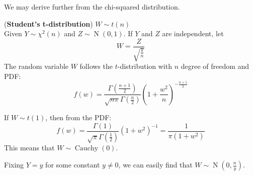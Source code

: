 \documentclass{huhtakm-template-book}
\DeclareMathOperator{\N}{N}
\DeclareMathOperator{\Cauchy}{Cauchy}
\begin{document}
We may derive further from the chi-squared distribution.
\begin{eg}(\textbf{Student's t-distribution}) $W\sim t(n)$\\
	Given $Y\sim\chi^{2}(n)$ and $Z\sim\N(0,1)$. If $Y$ and $Z$ are independent, let
	\begin{equation*}
		W=\frac{Z}{\sqrt{\frac{Y}{n}}}
	\end{equation*}
	The random variable $W$ follows the $t$-distribution with $n$ degree of freedom and PDF:
	\begin{equation*}
		f(w)=\frac{\Gamma\left(\frac{n+1}{2}\right)}{\sqrt{n\pi}\Gamma\left(\frac{n}{2}\right)}\left(1+\frac{w^{2}}{n}\right)^{-\frac{n+1}{2}}
	\end{equation*}
\end{eg}
\begin{rem}
	If $W\sim t(1)$, then from the PDF:
	\begin{equation*}
		f(w)=\frac{\Gamma(1)}{\sqrt{\pi}\Gamma\left(\frac{1}{2}\right)}(1+w^{2})^{-1}=\frac{1}{\pi(1+w^{2})}
	\end{equation*}
	This means that $W\sim\Cauchy(0)$.
\end{rem}
\begin{rem}
	Fixing $Y=y$ for some constant $y\neq 0$, we can easily find that $W\sim\N(0,\frac{n}{y})$.
\end{rem}
\end{document}
